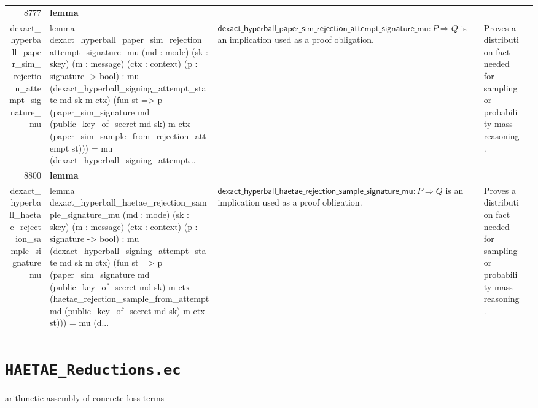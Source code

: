 \documentclass[10pt]{article}
\newcommand{\ec}[1]{\begingroup\ttfamily\scriptsize #1\endgroup}
\begin{document}
\begin{longtable}{r L{0.17\textwidth} L{0.26\textwidth} L{0.27\textwidth} L{0.20\textwidth}}
8777 & \textbf{lemma}\\\ec{dexact\_hyperball\_paper\_sim\_rejection\_attempt\_signature\_mu} & \ec{lemma dexact\_hyperball\_paper\_sim\_rejection\_attempt\_signature\_mu (md : mode) (sk : skey) (m : message) (ctx : context) (p : signature -> bool) : mu (dexact\_hyperball\_signing\_attempt\_state md sk m ctx) (fun st => p (paper\_sim\_signature md (public\_key\_of\_secret md sk) m ctx (paper\_sim\_sample\_from\_rejection\_attempt st))) = mu (dexact\_hyperball\_signing\_attempt...} & \(\mathsf{dexact\_hyperball\_paper\_sim\_rejection\_attempt\_signature\_mu} : P \Rightarrow Q\) is an implication used as a proof obligation. & Proves a distribution fact needed for sampling or probability mass reasoning. \\
8800 & \textbf{lemma}\\\ec{dexact\_hyperball\_haetae\_rejection\_sample\_signature\_mu} & \ec{lemma dexact\_hyperball\_haetae\_rejection\_sample\_signature\_mu (md : mode) (sk : skey) (m : message) (ctx : context) (p : signature -> bool) : mu (dexact\_hyperball\_signing\_attempt\_state md sk m ctx) (fun st => p (paper\_sim\_signature md (public\_key\_of\_secret md sk) m ctx (haetae\_rejection\_sample\_from\_attempt md (public\_key\_of\_secret md sk) m ctx st))) = mu (d...} & \(\mathsf{dexact\_hyperball\_haetae\_rejection\_sample\_signature\_mu} : P \Rightarrow Q\) is an implication used as a proof obligation. & Proves a distribution fact needed for sampling or probability mass reasoning. \\
\bottomrule
\end{longtable}

\clearpage
\section{\texorpdfstring{\texttt{HAETAE\_Reductions.ec}}{HAETAE Reductions.ec}}
arithmetic assembly of concrete loss terms
\end{document}
